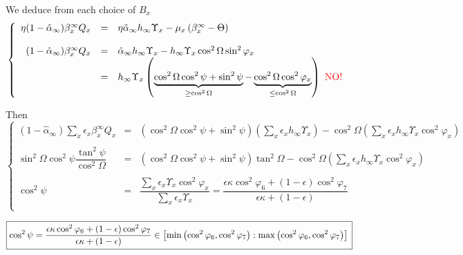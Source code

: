\documentclass[aps,onecolumn,10pt]{revtex4}
\begin{document}
\begin{itemize}
We deduce from each choice of $B_x$
\begin{equation}
\left\lbrace
\begin{array}{rcl}
	\eta (1-\hat\alpha_\infty) \beta_x^\infty Q_x & = & \eta \hat\alpha_\infty h_\infty \Upsilon_x - \mu_x\left(\beta_x^\infty - \Theta \right)\\
	\\
	 (1-\hat\alpha_\infty) \beta_x^\infty Q_x & = & \hat\alpha_\infty h_\infty \Upsilon_x -   {h_\infty\Upsilon_x\cos^2\Omega}\sin^2 \varphi_x\\
	 & = &  h_\infty \Upsilon_x \left( \underbrace{\cos^2\Omega \cos^2\psi + \sin^2\psi}_{\geq \cos^2\Omega} - \underbrace{\cos^2\Omega \cos^2 \varphi_x}_{\leq\cos^2\Omega} \right)\text{ \textcolor{red}{NO!} }\\
\end{array}
\right.
\end{equation}

Then
\begin{equation}
\left\lbrace
\begin{array}{rcl}
 (1-\hat\alpha_\infty) \sum_x \epsilon_x \beta_x^\infty Q_x & = & 
 \left(\cos^2\Omega \cos^2\psi + \sin^2\psi\right) \left(\sum_x \epsilon_x h_\infty \Upsilon_x\right) - \cos^2 \Omega \left(\sum_x \epsilon_x h_\infty \Upsilon_x \cos^2 \varphi_x \right)\\
 \\
\sin^2\Omega  \cos^2\psi \dfrac{\tan^2\psi}{\cos^2\Omega} & = & \left(\cos^2\Omega \cos^2\psi + \sin^2\psi\right) \tan^2 \Omega
 - \cos^2 \Omega \left(\sum_x \epsilon_x h_\infty \Upsilon_x \cos^2 \varphi_x \right)\\
 \\
 \cos^2\psi & = & \dfrac{\sum_x \epsilon_x \Upsilon_x \cos^2 \varphi_x }{\sum_x \epsilon_x \Upsilon_x} 
 = \dfrac{\epsilon\kappa\cos^2\varphi_6+(1-\epsilon)\cos^2\varphi_7}{\epsilon\kappa+(1-\epsilon)}\\
\end{array}
\right.
\end{equation}

\begin{equation}
	\boxed
	{
	\cos^2\psi = \dfrac{\epsilon\kappa\cos^2\varphi_6+(1-\epsilon)\cos^2\varphi_7}{\epsilon\kappa+(1-\epsilon)} 
	 \in  \left[\min\left(\cos^2\varphi_6,\cos^2\varphi_7\right):\max\left(\cos^2\varphi_6,\cos^2\varphi_7\right)\right] \\
	}
\end{equation}

\end{itemize}
\end{document}
